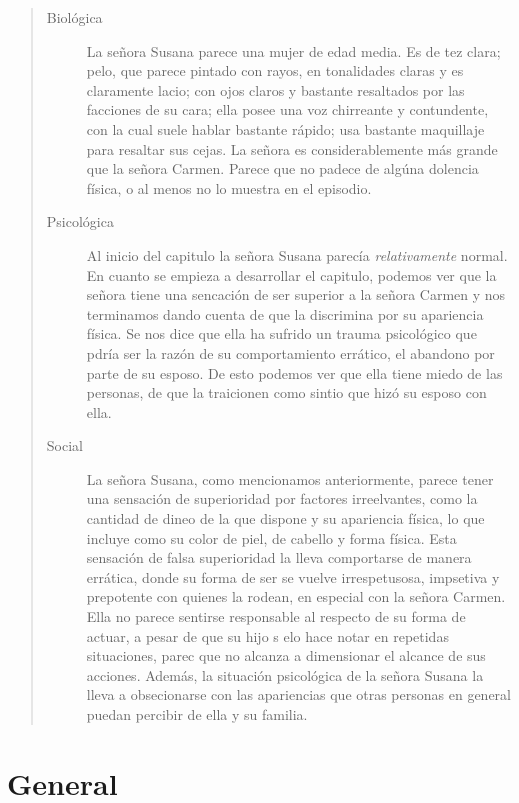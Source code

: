 \documentclass[12pt]{article}
\begin{document}
	\begin{quote}\begin{description}
		\item [Biol\'ogica] La se\~nora Susana parece una mujer de edad media. Es de tez clara; pelo, que parece pintado con rayos, en tonalidades claras y es claramente lacio; con ojos claros y bastante resaltados por las facciones de su cara; ella posee una voz chirreante y contundente, con la cual suele hablar bastante r\'apido; usa bastante maquillaje para resaltar sus cejas. La se\~nora es considerablemente m\'as grande que la se\~nora Carmen. Parece que no padece de alg\'una dolencia f\'isica, o al menos no lo muestra en el episodio.
		\item [Psicol\'ogica] Al inicio del capitulo la se\~nora Susana parec\'ia \textit{relativamente} normal. En cuanto se empieza a desarrollar el capitulo, podemos ver que la se\~nora tiene una sencaci\'on de ser superior a la se\~nora Carmen y nos terminamos dando cuenta de que la discrimina por su apariencia f\'isica. Se nos dice que ella ha sufrido un trauma psicol\'ogico que pdr\'ia ser la raz\'on de su comportamiento err\'atico, el abandono por parte de su esposo. De esto podemos ver que ella tiene miedo de las personas, de que la traicionen como sintio que hiz\'o su esposo con ella.
		\item [Social] La se\~nora Susana, como mencionamos anteriormente, parece tener una sensaci\'on de superioridad por factores irreelvantes, como la cantidad de dineo de la que dispone y su apariencia f\'isica, lo que incluye como su color de piel, de cabello y forma f\'isica. Esta sensaci\'on de falsa superioridad la lleva comportarse de manera err\'atica, donde su forma de ser se vuelve irrespetusosa, impsetiva y prepotente con quienes la rodean, en especial con la se\~nora Carmen. Ella no parece sentirse responsable al respecto de su forma de actuar, a pesar de que su hijo s elo hace notar en repetidas situaciones, parec que no alcanza a dimensionar el alcance de sus acciones. Adem\'as, la situaci\'on psicol\'ogica de la se\~nora Susana la lleva a obsecionarse con las apariencias que otras personas en general puedan percibir de ella y su familia.
	\end{description}\end{quote}

\section*{General}
\end{document}
